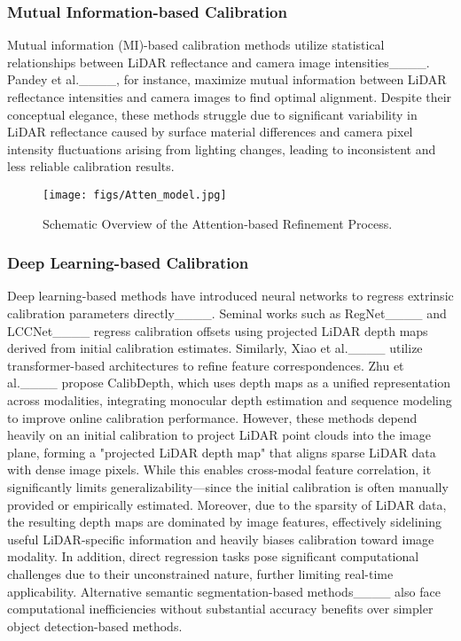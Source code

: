 \subsubsection{Mutual Information-based Calibration}
Mutual information (MI)-based calibration methods utilize statistical relationships between LiDAR reflectance and camera image intensities____. Pandey et al.____, for instance, maximize mutual information between LiDAR reflectance intensities and camera images to find optimal alignment. Despite their conceptual elegance, these methods struggle due to significant variability in LiDAR reflectance caused by surface material differences and camera pixel intensity fluctuations arising from lighting changes, leading to inconsistent and less reliable calibration results.
\begin{figure}[]
	\centering
	\texttt{[image: figs/Atten\_model.jpg]}
	\caption{Schematic Overview of the Attention-based Refinement Process.}
	\label{Atten_model}
\end{figure}
\subsubsection{Deep Learning-based Calibration}
Deep learning-based methods have introduced neural networks to regress extrinsic calibration parameters directly____. Seminal works such as RegNet____ and LCCNet____ regress calibration offsets using projected LiDAR depth maps derived from initial calibration estimates. Similarly, Xiao et al.____ utilize transformer-based architectures to refine feature correspondences. Zhu et al.____ propose CalibDepth, which uses depth maps as a unified representation across modalities, integrating monocular depth estimation and sequence modeling to improve online calibration performance. However, these methods depend heavily on an initial calibration to project LiDAR point clouds into the image plane, forming a "projected LiDAR depth map" that aligns sparse LiDAR data with dense image pixels. While this enables cross-modal feature correlation, it significantly limits generalizability—since the initial calibration is often manually provided or empirically estimated. Moreover, due to the sparsity of LiDAR data, the resulting depth maps are dominated by image features, effectively sidelining useful LiDAR-specific information and heavily biases calibration toward image modality. In addition, direct regression tasks pose significant computational challenges due to their unconstrained nature, further limiting real-time applicability. Alternative semantic segmentation-based methods____ also face computational inefficiencies without substantial accuracy benefits over simpler object detection-based methods.



